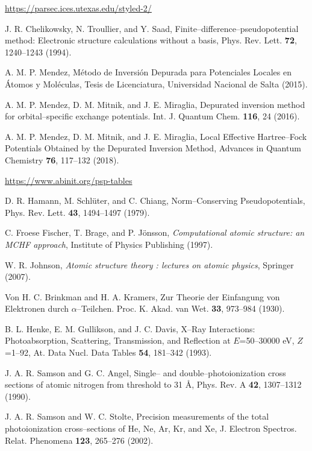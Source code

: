 \documentclass[10pt]{article}
\begin{document}
\begin{thebibliography}{10}

\url{https://parsec.ices.utexas.edu/styled-2/}

J. R. Chelikowsky, N. Troullier, and Y. Saad,
Finite--difference--pseudopotential method: Electronic structure 
calculations without a basis,
Phys. Rev. Lett. {\bf 72}, 1240--1243 (1994).

A. M. P. Mendez,
M\'etodo de Inversi\'on Depurada para Potenciales Locales en 
\'Atomos y Mol\'eculas, 
Tesis de Licenciatura, Universidad Nacional de Salta (2015).

A. M. P. Mendez, D. M. Mitnik, and J. E. Miraglia,
Depurated inversion method for orbital--specific exchange potentials.
Int. J. Quantum Chem. {\bf 116}, 24 (2016).

A. M. P. Mendez, D. M. Mitnik, and J. E. Miraglia,
Local Effective Hartree--Fock Potentials Obtained by the Depurated 
Inversion Method, 
Advances in Quantum Chemistry {\bf 76}, 117--132 (2018).

\url{https://www.abinit.org/psp-tables}

D. R. Hamann, M. Schl\"uter, and C. Chiang,
Norm--Conserving Pseudopotentials,
Phys. Rev. Lett. {\bf 43}, 1494--1497 (1979).

C. Froese Fischer, T. Brage, and P. J\"onsson,
{\em Computational atomic structure: an MCHF approach},
Institute of Physics Publishing (1997).

W. R. Johnson,
{\em Atomic structure theory : lectures on atomic physics},
Springer (2007).

Von H. C. Brinkman and H. A. Kramers,
Zur Theorie der Einfangung von Elektronen durch $\alpha$--Teilchen.
Proc. K. Akad. van Wet. {\bf 33}, 973--984 (1930).

B. L. Henke, E. M. Gullikson, and J. C. Davis,
X--Ray Interactions: Photoabsorption, Scattering, Transmission, and
Reflection at $E$=50--30000 eV, $Z$=1--92,
At. Data Nucl. Data Tables {\bf 54}, 181--342 (1993).

J. A. R. Samson and G. C. Angel,
Single-- and double--photoionization cross sections of atomic nitrogen
from threshold to 31 \AA,
Phys. Rev. A {\bf 42}, 1307--1312 (1990).

J. A. R. Samson and W. C. Stolte,
Precision measurements of the total photoionization cross--sections
of He, Ne, Ar, Kr, and Xe,
J. Electron Spectros. Relat. Phenomena {\bf 123}, 265--276 (2002).


\end{thebibliography}
\end{document}
